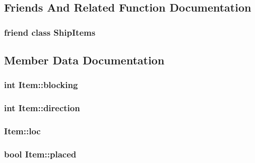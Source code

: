 \subsection{Friends And Related Function Documentation}
\hypertarget{classItem_a93f19dfd48656b5ff656596791c0923d}{
\subsubsection[{Ship\-Items}]{\setlength{\rightskip}{0pt plus 5cm}friend class {\bf Ship\-Items}\hspace{0.3cm}{\ttfamily [friend]}}}\label{classItem_a93f19dfd48656b5ff656596791c0923d}


\subsection{Member Data Documentation}
\hypertarget{classItem_a5166900b24ba9e746a7ad34c00353cdd}{
\subsubsection[{blocking}]{\setlength{\rightskip}{0pt plus 5cm}int Item\-::blocking\hspace{0.3cm}{\ttfamily [protected]}}}\label{classItem_a5166900b24ba9e746a7ad34c00353cdd}
\hypertarget{classItem_a1812b51dc93d2142c0641c536fbef617}{
\subsubsection[{direction}]{\setlength{\rightskip}{0pt plus 5cm}int Item\-::direction\hspace{0.3cm}{\ttfamily [protected]}}}\label{classItem_a1812b51dc93d2142c0641c536fbef617}
\hypertarget{classItem_ade907eeeea58df68fcacde1e5568779b}{
\subsubsection[{loc}]{ Item\-::loc}}\label{classItem_ade907eeeea58df68fcacde1e5568779b}
\hypertarget{classItem_a0b61e2b275f9a5958d7238a0d6578235}{
\subsubsection[{placed}]{\setlength{\rightskip}{0pt plus 5cm}bool Item\-::placed\hspace{0.3cm}{\ttfamily [protected]}}}\label{classItem_a0b61e2b275f9a5958d7238a0d6578235}
